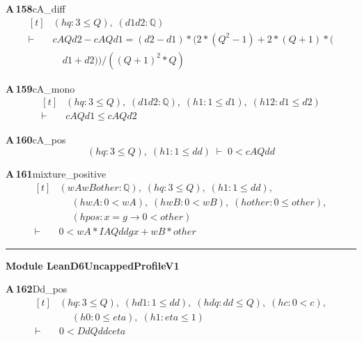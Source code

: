 \documentclass[conference]{IEEEtran}
\theoremstyle{definition}
\newcommand{\lean}[1]{\textsf{\footnotesize #1}}
\begin{document}
\noindent\textbf{A\,158}\quad\lean{cA\_diff}
{\footnotesize\[ \begin{aligned}[t]
&(\mathit{hq} : 3 \leq \mathit{Q}),\; (\mathit{d1} \mathit{d2} : \mathbb{Q} )\\
\vdash\;&\mathit{cA} \mathit{Q} \mathit{d2} - \mathit{cA} \mathit{Q} \mathit{d1} = (\mathit{d2} - \mathit{d1})*(2*(\mathit{Q}^{2} - 1) + 2*(\mathit{Q} + 1)*(\\
&\quad \mathit{d1} + \mathit{d2})) / ((\mathit{Q} + 1)^{2}*\mathit{Q})
\end{aligned} \]}

\noindent\textbf{A\,159}\quad\lean{cA\_mono}
{\footnotesize\[ \begin{aligned}[t]
&(\mathit{hq} : 3 \leq \mathit{Q}),\; (\mathit{d1} \mathit{d2} : \mathbb{Q} ),\; (\mathit{h1} : 1 \leq \mathit{d1}),\; (\mathit{h12} : \mathit{d1} \leq \mathit{d2})\\
\vdash\;&\mathit{cA} \mathit{Q} \mathit{d1} \leq \mathit{cA} \mathit{Q} \mathit{d2}
\end{aligned} \]}

\noindent\textbf{A\,160}\quad\lean{cA\_pos}
{\footnotesize\[ (\mathit{hq} : 3 \leq \mathit{Q}),\; (\mathit{h1} : 1 \leq \mathit{dd}) \;\vdash\; 0 < \mathit{cA} \mathit{Q} \mathit{dd} \]}

\noindent\textbf{A\,161}\quad\lean{mixture\_positive}
{\footnotesize\[ \begin{aligned}[t]
&(\mathit{wA} \mathit{wB} \mathit{other} : \mathbb{Q} ),\; (\mathit{hq} : 3 \leq \mathit{Q}),\; (\mathit{h1} : 1 \leq \mathit{dd}),\\
&\quad \; (\mathit{hwA} : 0 < \mathit{wA}),\; (\mathit{hwB} : 0 < \mathit{wB}),\; (\mathit{hother} : 0 \leq \mathit{other}),\\
&\quad \; (\mathit{hpos} : \mathit{x} = \mathit{g} \to 0 < \mathit{other})\\
\vdash\;&0 < \mathit{wA} * \mathit{IA} \mathit{Q} \mathit{dd} \mathit{g} \mathit{x} + \mathit{wB} * \mathit{other}
\end{aligned} \]}

\vspace{4pt}\noindent\rule{\columnwidth}{0.4pt}\par\vspace{2pt}
\noindent\textbf{Module \lean{LeanD6UncappedProfileV1}}\par\vspace{3pt}

\noindent\textbf{A\,162}\quad\lean{Dd\_pos}
{\footnotesize\[ \begin{aligned}[t]
&(\mathit{hq} : 3 \leq \mathit{Q}),\; (\mathit{hd1} : 1 \leq \mathit{dd}),\; (\mathit{hdq} : \mathit{dd} \leq \mathit{Q}),\; (\mathit{hc} : 0 < \mathit{c}),\\
&\quad \; (\mathit{h0} : 0 \leq \mathit{eta}),\; (\mathit{h1} : \mathit{eta} \leq 1)\\
\vdash\;&0 < \mathit{Dd} \mathit{Q} \mathit{dd} \mathit{c} \mathit{eta}
\end{aligned} \]}
\end{document}
